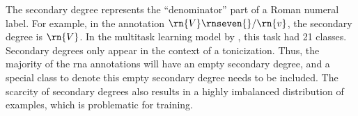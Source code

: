 
The secondary degree represents the ``denominator'' part of
a Roman numeral label. For example, in the annotation
$\rn{V}\rnseven{}/\rn{v}$, the secondary degree is $\rn{V}$.
In the multitask learning model by
\textcite{chen2018functional}, this task had 21 classes.
Secondary degrees only appear in the context of a
tonicization. Thus, the majority of the \gls{rna}
annotations will have an empty secondary degree, and a
special class to denote this empty secondary degree needs to
be included. The scarcity of secondary degrees also results
in a highly imbalanced distribution of examples, which is
problematic for training.
